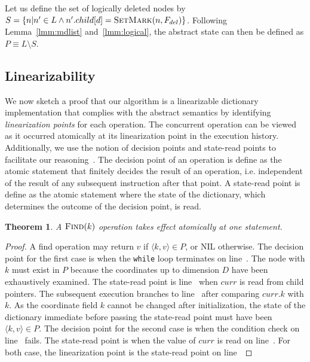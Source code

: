 \documentclass[10pt,conference,compsocconf]{IEEEtran}
\newtheorem{theorem}{Theorem}
\newcommand\NIL{\text{NIL}}
\begin{document}
Let us define the set of logically deleted nodes by $S=\{n|n'\in L \land n'.child[d] = \textsc{SetMark}(n, F_{del})\}$.
Following Lemma~\ref{lmm:mdlist} and~\ref{lmm:logical}, the abstract state can then be defined as $P \equiv L \setminus S$.

\subsection{Linearizability}
We now sketch a proof that our algorithm is a linearizable dictionary implementation that complies with the abstract semantics by identifying \emph{linearization points} for each operation.
The concurrent operation can be viewed as it occurred atomically at its linearization point in the execution history.
Additionally, we use the notion of decision points and state-read points to facilitate our reasoning~\cite{sundell2004scalable}. 
The decision point of an operation is define as the atomic statement that finitely decides the result of an operation, i.e. independent of the result of any subsequent instruction after that point.
A state-read point is define as the atomic statement where the state of the dictionary, which determines the outcome of the decision point, is read.

\begin{theorem}
    A $\textsc{Find}(k)$ operation takes effect atomically at one statement.
\end{theorem}
\begin{proof}
    A find operation may return $v$ if $\langle k,v \rangle \in P$, or $\NIL$ otherwise.  
    The decision point for the first case is when the \texttt{while} loop terminates on line~.
    The node with $k$ must exist in $P$ because the coordinates up to dimension $D$ have been exhaustively examined.
    The state-read point is line~ when $curr$ is read from child pointers.
    The subsequent execution branches to line~ after comparing $curr.k$ with $k$.
    As the coordinate field $k$ cannot be changed after initialization, the state of the dictionary immediate before passing the state-read point must have been $\langle k,v \rangle \in P$.
    The decision point for the second case is when the condition check on line~ fails.
    The state-read point is when the value of $curr$ is read on line~.
    For both case, the linearization point is the state-read point on line~
\end{proof}
\end{document}
